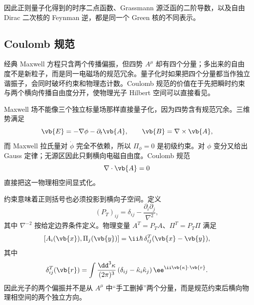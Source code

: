 因此正则量子化得到的时序二点函数、Grassmann 源泛函的二阶导数，以及自由 Dirac 二次核的 Feynman 逆，都是同一个 Green 核的不同表示。

\subsection{Coulomb 规范}

经典 Maxwell 方程只含两个传播偏振，但四势 \(A^\mu\) 却有四个分量；多出来的自由度不是新粒子，而是同一电磁场的规范冗余。量子化时如果把四个分量都当作独立谐振子，会同时破坏约束和物理态计数。Coulomb 规范的价值在于先把瞬时约束与两个横向传播自由度分开，使物理光子 Hilbert 空间可以直接看见。

Maxwell 场不能像三个独立标量场那样直接量子化，因为四势含有规范冗余。三维势满足
\begin{equation*}
\vb{E}=-\nabla\phi-\partial_t\vb{A},
\qquad
\vb{B}=\nabla\times\vb{A},
\end{equation*}
而 Maxwell 拉氏量对 $\dot\phi$ 完全不依赖，所以 $\Pi_\phi=0$ 是初级约束。对 $\phi$ 变分又给出 Gauss 定律；无源区因此只剩横向电磁自由度。Coulomb 规范
\begin{equation*}
\nabla\cdot\vb{A}=0
\end{equation*}
直接把这一物理相空间显式化。

约束意味着正则括号也必须投影到横向子空间。定义
\begin{equation*}
(P_T)_{ij}=\delta_{ij}-\frac{\partial_i\partial_j}{\nabla^2},
\end{equation*}
其中 $\nabla^{-2}$ 按给定边界条件定义。物理变量 $A^T=P_TA$、$\Pi^T=P_T\Pi$ 满足
\begin{equation}
{
[A_i(\vb{x}),\Pi_j(\vb{y})]
=\ii\hbar\,\delta^T_{ij}(\vb{x}-\vb{y}),}
\label{eq:transverse-comm-r2}
\end{equation}
其中
\begin{equation*}
\delta^T_{ij}(\vb{r})
=\int\frac{\dd^3 \kappa}{(2\pi)^3}
\left(\delta_{ij}-\hat\kappa_i\hat\kappa_j\right)\ee^{\ii\vb{\kappa}\cdot\vb{r}}.
\end{equation*}
因此光子的两个偏振并不是从 $A^\mu$ 中“手工删掉”两个分量，而是规范约束后横向物理相空间的两个独立方向。

